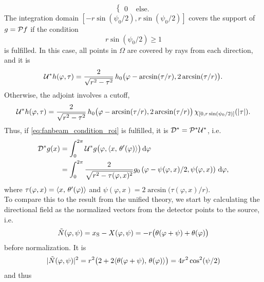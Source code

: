 \documentclass{amsart}
\renewcommand*{\phi}{\varphi}
\begin{document}
\begin{example}
\begin{equation*}
\begin{cases}
   0 & \text{ else}.
  \end{cases}
 \end{equation*}
 The integration domain $[-r\sin(\psi_0/2), r\sin(\psi_0/2)]$ covers the support of $g = {\mathcal{P}} f$ if the condition
 \begin{equation}
  \label{eq:fanbeam_condition_roi}
  r \sin(\psi_0/2) \geq 1
 \end{equation}
 is fulfilled. In this case, all points in $\Omega$ are covered by rays from each direction, and it is
 \begin{equation}
  \label{eq:fanbeam_unit_trafo_adj_good}
  \DUALOPU h(\phi, \tau) = \frac{2}{\sqrt{r^2-\tau^2}} \, h_0\big(\phi - \arcsin(\tau/r), 2\arcsin(\tau/r)\big).
 \end{equation}
 Otherwise, the adjoint involves a cutoff,
 \begin{equation}
  \label{eq:fanbeam_unit_trafo_adj_bad}
  \DUALOPU h(\phi, \tau) = \frac{2}{\sqrt{r^2-\tau^2}} \, h_0\big(\phi - \arcsin(\tau/r), 2\arcsin(\tau/r)\big)\, 
  \chi_{[0, r\sin(\psi_0/2)]}(\ABS{\tau}).
 \end{equation}
 Thus, if \eqref{eq:fanbeam_condition_roi} is fulfilled, it is ${{\mathcal{D}}^*} = {{\mathcal{P}}^*}{{\mathcal{U}}^*}$, i.e.
 \begin{align}
  \label{eq:fanbeam_backproj}
  \DUALOPD g(x)
  &= \int_0^{2\pi} \DUALOPU g\big(\phi, \INNER{x}{\theta'(\phi)}\big)\, \D\phi \\
  &= \int_0^{2\pi} \frac{2}{\sqrt{r^2-\tau(\phi, x)^2}} g_0\left(\phi - \psi(\phi,x)/2, \psi(\phi,x) \right)\, \D\phi,
 \end{align}
 where $\tau(\phi,x) = \INNER{x}{\theta'(\phi)}$ and $\psi(\phi,x) = 2\arcsin\big(\tau(\phi,x)/r\big)$.\\[1ex]
 To compare this to the result from the unified theory, we start by calculating the directional field as the normalized vectors from the 
 detector points to the source, i.e.
 \begin{equation*}
  \tilde N(\phi, \psi) 
  = x_{\mathrm{S}} - X(\phi, \psi) \\
  = - r \big(\theta(\phi + \psi) + \theta(\phi)\big)
 \end{equation*}
 before normalization. It is
 \begin{align*}
  \ABS{\tilde N(\phi, \psi)}^2 = r^2 \big(2 + 2\INNER{\theta(\phi + \psi)}{\theta(\phi)} \big) = 4 r^2 \cos^2(\psi/2)
 \end{align*}
 and thus
 \begin{equation*}

\end{equation*}
\end{example}
\end{document}
